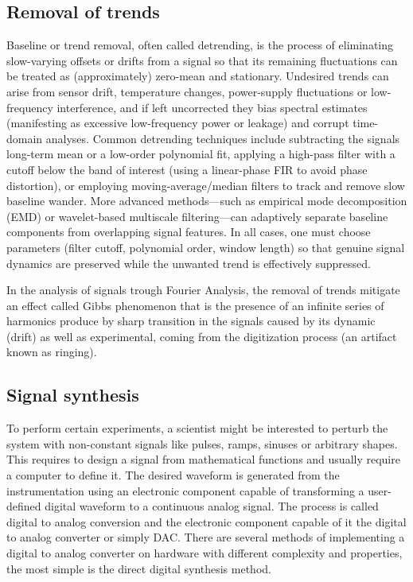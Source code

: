 \subsection{Removal of trends}
Baseline or trend removal, often called detrending, is the process of eliminating slow-varying offsets or drifts from a signal so that its remaining fluctuations can be treated as (approximately) zero-mean and stationary.  Undesired trends can arise from sensor drift, temperature changes, power-supply fluctuations or low-frequency interference, and if left uncorrected they bias spectral estimates (manifesting as excessive low-frequency power or leakage) and corrupt time-domain analyses.  Common detrending techniques include subtracting the signals long-term mean or a low-order polynomial fit, applying a high-pass filter with a cutoff below the band of interest (using a linear-phase FIR to avoid phase distortion), or employing moving-average/median filters to track and remove slow baseline wander.  More advanced methods—such as empirical mode decomposition (EMD) or wavelet-based multiscale filtering—can adaptively separate baseline components from overlapping signal features.  In all cases, one must choose parameters (filter cutoff, polynomial order, window length) so that genuine signal dynamics are preserved while the unwanted trend is effectively suppressed.

In the analysis of signals trough Fourier Analysis, the removal of trends mitigate an effect called Gibbs phenomenon that is the presence of an infinite series of harmonics produce by sharp transition in the signals caused by its dynamic (drift) as well as experimental, coming from the digitization process (an artifact known as ringing).

\subsection{Signal synthesis}

To perform certain experiments, a scientist might be interested to perturb the system with non-constant signals like pulses, ramps, sinuses or arbitrary shapes. This requires to design a signal from mathematical functions and usually require a computer to define it. The desired waveform is generated from the instrumentation using an electronic component capable of transforming a user-defined digital waveform to a continuous analog signal. The process is called digital to analog conversion and the electronic component capable of it the digital to analog converter or simply DAC. There are several methods of implementing a digital to analog converter on hardware with different complexity and properties, the most simple is the direct digital synthesis method.

